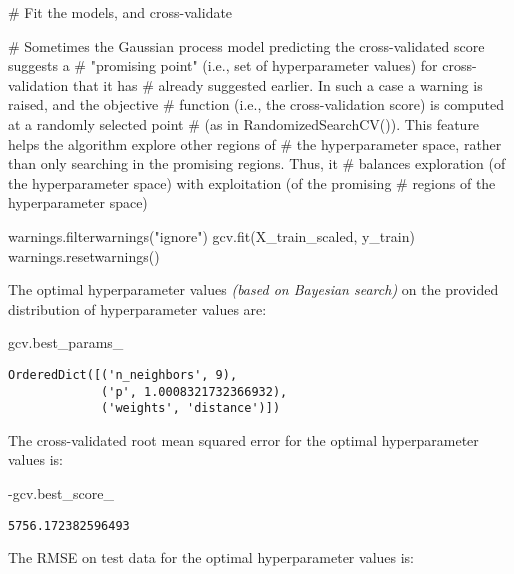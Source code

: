 \documentclass[
  letterpaper,
  DIV=11,
  numbers=noendperiod]{scrreprt}
\newenvironment{Shaded}{\begin{snugshade}}{\end{snugshade}}
\newcommand{\CommentTok}[1]{\textcolor[rgb]{0.37,0.37,0.37}{#1}}
\newcommand{\NormalTok}[1]{\textcolor[rgb]{0.00,0.23,0.31}{#1}}
\newcommand{\OperatorTok}[1]{\textcolor[rgb]{0.37,0.37,0.37}{#1}}
\newcommand{\StringTok}[1]{\textcolor[rgb]{0.13,0.47,0.30}{#1}}
\begin{document}
\begin{Shaded}
\begin{Highlighting}[]
\CommentTok{\# Fit the models, and cross{-}validate}

\CommentTok{\# Sometimes the Gaussian process model predicting the cross{-}validated score suggests a }
\CommentTok{\# "promising point" (i.e., set of hyperparameter values) for cross{-}validation that it has }
\CommentTok{\# already suggested earlier. In such  a case a warning is raised, and the objective }
\CommentTok{\# function (i.e., the cross{-}validation score) is computed at a randomly selected point }
\CommentTok{\# (as in RandomizedSearchCV()). This feature helps the algorithm explore other regions of}
\CommentTok{\# the hyperparameter space, rather than only searching in the promising regions. Thus, it }
\CommentTok{\# balances exploration (of the hyperparameter space) with exploitation (of the promising }
\CommentTok{\# regions of the hyperparameter space)}

\NormalTok{warnings.filterwarnings(}\StringTok{"ignore"}\NormalTok{)}
\NormalTok{gcv.fit(X\_train\_scaled, y\_train)}
\NormalTok{warnings.resetwarnings()}
\end{Highlighting}
\end{Shaded}

The optimal hyperparameter values \emph{(based on Bayesian search)} on
the provided distribution of hyperparameter values are:

\begin{Shaded}
\begin{Highlighting}[]
\NormalTok{gcv.best\_params\_}
\end{Highlighting}
\end{Shaded}

\begin{verbatim}
OrderedDict([('n_neighbors', 9),
             ('p', 1.0008321732366932),
             ('weights', 'distance')])
\end{verbatim}

The cross-validated root mean squared error for the optimal
hyperparameter values is:

\begin{Shaded}
\begin{Highlighting}[]
\OperatorTok{{-}}\NormalTok{gcv.best\_score\_}
\end{Highlighting}
\end{Shaded}

\begin{verbatim}
5756.172382596493
\end{verbatim}

The RMSE on test data for the optimal hyperparameter values is:
\end{document}
